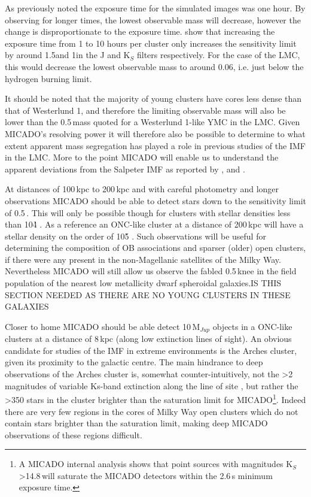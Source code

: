 As previously noted the exposure time for the simulated images was one hour. 
By observing for longer times, the lowest observable mass will decrease, however the change is disproportionate to the exposure time. 
\citet{leschinski2016} show that increasing the exposure time from 1 to 10 hours per cluster only increases the sensitivity limit by around 1.5\m and 1\m in the J and K$_S$ filters respectively. 
For the case of the LMC, this would decrease the lowest observable mass to around 0.06\msune, i.e. just below the hydrogen burning limit.

It should be noted that the majority of young clusters have cores less dense than that of Westerlund 1, and therefore the limiting observable mass will also be lower than the 0.5\,\msun mass quoted for a Westerlund 1-like YMC in the LMC. 
Given MICADO's resolving power it will therefore also be possible to determine to what extent apparent mass segregation has played a role in previous studies of the IMF in the LMC.\needcite 
More to the point MICADO will enable us to understand the apparent deviations from the Salpeter IMF as reported by \citet{dario2009}, \citet{geha2013} and \citet{kalirai2013}.


At distances of 100\,kpc to 200\,kpc and with careful photometry and longer observations MICADO should be able to detect stars down to the sensitivity limit of 0.5\,\msun. 
This will only be possible though for clusters with stellar densities less than 10\h4 \spa. 
As a reference an ONC-like cluster at a distance of 200\,kpc will have a stellar density on the order of 10\h5 \spa. 
Such observations will be useful for determining the composition of OB associations and sparser (older) open clusters, if there were any present in the non-Magellanic satellites of the Milky Way. 
Nevertheless MICADO will still allow us observe the fabled 0.5\,\msun knee in the field population of the nearest low metallicity dwarf spheroidal galaxies.\rewrite IS THIS SECTION NEEDED AS THERE ARE NO YOUNG CLUSTERS IN THESE GALAXIES

Closer to home MICADO should be able detect 10\,M$_{Jup}$ objects in a ONC-like clusters at a distance of 8\,kpc (along low extinction lines of sight). 
An obvious candidate for studies of the IMF in extreme environments is the Arches cluster, given its proximity to the galactic centre.
The main hindrance to deep observations of the Arches cluster is, somewhat counter-intuitively, not the \textgreater2 magnitudes of variable Ks-band extinction along the line of site \citep{espinoza2009}, but rather the \textgreater350 stars in the cluster \citep{galacticnucleaus} brighter than the saturation limit for MICADO\footnote{A MICADO internal analysis shows that point sources with magnitudes K$_S$\textgreater14.8\,\m will saturate the MICADO detectors within the 2.6\,s minimum exposure time.}.
Indeed there are very few regions in the cores of Milky Way open clusters which do not contain stars brighter than the saturation limit, making deep MICADO observations of these regions difficult.


